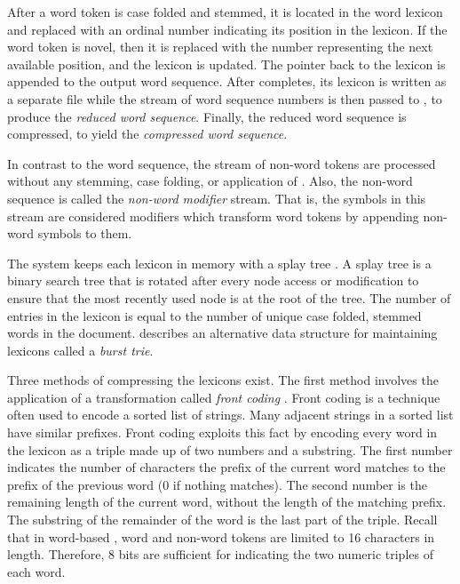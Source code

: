 
After a word token is case folded and stemmed, it is located 
in the word lexicon and replaced with an ordinal number
indicating its position in the lexicon.  If the word token is
novel, then it
is replaced with the number representing the next 
available position, and the lexicon is updated.  
The pointer back to the lexicon is appended to the output word sequence.
After \prepair completes, its lexicon is written as a separate file 
while the stream of word sequence numbers
is then passed to \repair, to produce 
the {\emph {reduced word sequence}}.  Finally, the reduced word
sequence is compressed, to yield the 
{\emph {compressed word sequence}}.  

In contrast to the word sequence, the stream of 
non-word tokens are processed without any stemming, case folding, 
or application of \repair.  Also, the non-word sequence is
called the {\emph {non-word modifier}} stream.  That is, the
symbols in this stream are considered modifiers which
transform word tokens by appending non-word symbols to them.

The \prepair system keeps each lexicon in memory with a
splay tree \citep{st85:jacm}.  A splay tree
is a binary search tree that is rotated after every node access or 
modification to ensure that the most recently used node is at 
the root of the tree.  The number of entries in the lexicon is 
equal to the number of unique case folded, stemmed words in the
document.  \citet{hzw02:tis} describes an alternative data
structure for maintaining lexicons called a {\emph {burst trie}}.

Three methods of compressing the lexicons exist.
The first method involves the application of a transformation 
called {\emph {front coding}} \citep{ghlr75:ncc}.  
Front coding is a technique often used to encode a sorted list
of strings.  Many adjacent strings in a sorted list have 
similar prefixes.  Front coding exploits this fact by encoding
every word in the lexicon as a triple made up of two numbers and
a substring.  The first number indicates the number of characters
the prefix of the current word matches to the prefix of the 
previous word (0 if nothing matches).  The second number is the 
remaining length of the current word, without the length of the 
matching prefix.  The substring of the remainder of
the word is the last part of the triple.
Recall that in word-based \repair, word and non-word tokens are 
limited to 16 characters in length.  Therefore, 8 bits are 
sufficient for indicating the two numeric triples of each word.

